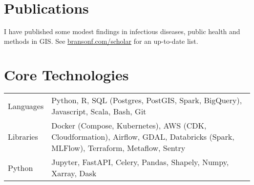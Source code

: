 \documentclass[a4paper,12pt]{article}
\begin{document}
\section{Publications}

I have published some modest findings in infectious diseases, public health and methods in GIS. See \href{https://bransonf.com/scholar}{bransonf.com/scholar} for an up-to-date list.

\section{Core Technologies}
\begin{tabularx}{\linewidth}{@{}l X@{}}
Languages &  \normalsize{Python, R, SQL (Postgres, PostGIS, Spark, BigQuery), Javascript, Scala, Bash, Git}\\
Libraries & \normalsize{Docker (Compose, Kubernetes), AWS (CDK, Cloudformation), Airflow, GDAL, Databricks (Spark, MLFlow), Terraform, Metaflow, Sentry} \\
Python & \normalsize{Jupyter, FastAPI, Celery, Pandas, Shapely, Numpy, Xarray, Dask}
\end{tabularx}
\end{document}

